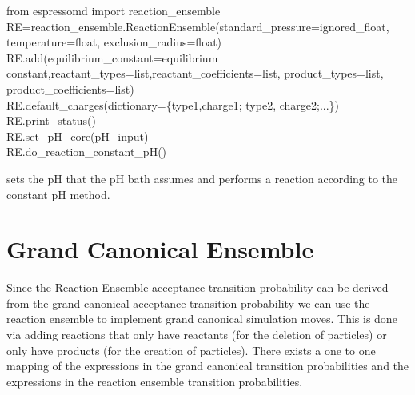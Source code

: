   \begin{pysyntax}
  	from espressomd import reaction_ensemble \\
  	RE=reaction_ensemble.ReactionEnsemble(standard_pressure=ignored_float, temperature=float, exclusion_radius=float) \\
  	RE.add(equilibrium_constant=equilibrium constant,reactant_types=list,reactant_coefficients=list, product_types=list, product_coefficients=list) \\
  	RE.default_charges(dictionary=\{type1,charge1; type2, charge2;...\}) \\
	RE.print_status() \\
	 RE.set_pH_core(pH_input) \\
	 RE.do_reaction_constant_pH() 
	\begin{features}
	\end{features}
\end{pysyntax}


 sets the pH that the pH bath assumes and  performs a reaction according to the constant pH method.


\section{Grand Canonical Ensemble}
Since the Reaction Ensemble acceptance transition probability can be derived from the grand canonical acceptance transition probability we can use the reaction ensemble to implement grand canonical simulation moves. This is done via adding reactions that only have reactants (for the deletion of particles) or only have products (for the creation of particles). There exists a one to one mapping of the expressions in the grand canonical transition probabilities and the expressions in the reaction ensemble transition probabilities.
